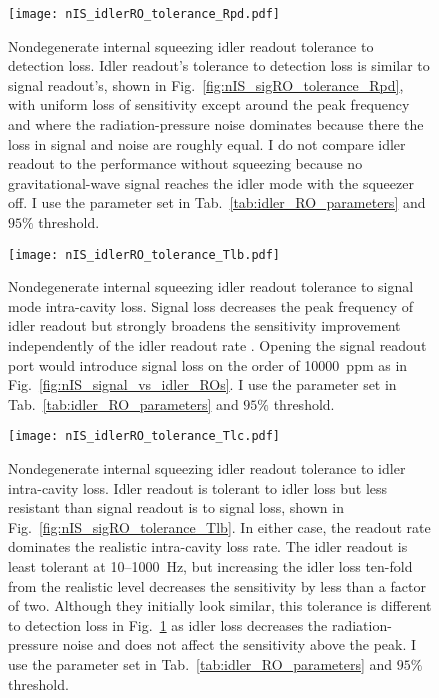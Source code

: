 \begin{figure}
    \centering
    \texttt{[image: nIS\_idlerRO\_tolerance\_Rpd.pdf]} 
    \caption{ Nondegenerate internal squeezing idler readout tolerance to detection loss. Idler readout's tolerance to detection loss is similar to signal readout's, shown in Fig.~\ref{fig:nIS_sigRO_tolerance_Rpd}, with uniform loss of sensitivity except around the peak frequency and where the radiation-pressure noise dominates because there the loss in signal and noise are roughly equal. I do not compare idler readout to the performance without squeezing because no gravitational-wave signal reaches the idler mode with the squeezer off. I use the parameter set in Tab.~\ref{tab:idler_RO_parameters} and $95\%$ threshold.}
    \label{fig:nIS_idlerRO_tolerance_Rpd}
\end{figure}
\begin{figure}
	\centering
	\texttt{[image: nIS\_idlerRO\_tolerance\_Tlb.pdf]}
	\caption{Nondegenerate internal squeezing idler readout tolerance to signal mode intra-cavity loss. Signal loss decreases the peak frequency of idler readout but strongly broadens the sensitivity improvement independently of the idler readout rate . Opening the signal readout port would introduce signal loss on the order of 10000~ppm as in Fig.~\ref{fig:nIS_signal_vs_idler_ROs}. I use the parameter set in Tab.~\ref{tab:idler_RO_parameters} and $95\%$ threshold.}
	\label{fig:nIS_idlerRO_tolerance_Tlb}
\end{figure}
\begin{figure}
	\centering
	\texttt{[image: nIS\_idlerRO\_tolerance\_Tlc.pdf]}
	\caption{ Nondegenerate internal squeezing idler readout tolerance to idler intra-cavity loss. Idler readout is tolerant to idler loss but less resistant than signal readout is to signal loss, shown in Fig.~\ref{fig:nIS_sigRO_tolerance_Tlb}. In either case, the readout rate dominates the realistic intra-cavity loss rate. The idler readout is least tolerant at 10--1000~Hz, but increasing the idler loss ten-fold from the realistic level decreases the sensitivity by less than a factor of two. Although they initially look similar, this tolerance is different to detection loss in Fig.~\ref{fig:nIS_idlerRO_tolerance_Rpd} as idler loss decreases the radiation-pressure noise and does not affect the sensitivity above the peak. I use the parameter set in Tab.~\ref{tab:idler_RO_parameters} and $95\%$ threshold.}
	\label{fig:nIS_idlerRO_tolerance_Tlc}
\end{figure}
